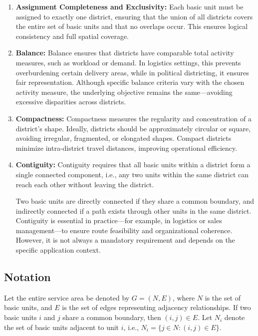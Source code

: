 \documentclass[preprint,12pt,authoryear]{elsarticle}
\begin{document}
\begin{enumerate}
    \item \textbf{Assignment Completeness and Exclusivity:} 
    Each basic unit must be assigned to exactly one district, ensuring that the union of all districts covers the entire set of basic units and that no overlaps occur. This ensures logical consistency and full spatial coverage.

    \item \textbf{Balance:} 
    Balance ensures that districts have comparable total activity measures, such as workload or demand. In logistics settings, this prevents overburdening certain delivery areas, while in political districting, it ensures fair representation. Although specific balance criteria vary with the chosen activity measure, the underlying objective remains the same—avoiding excessive disparities across districts.

    \item \textbf{Compactness:} 
    Compactness measures the regularity and concentration of a district’s shape. Ideally, districts should be approximately circular or square, avoiding irregular, fragmented, or elongated shapes. Compact districts minimize intra-district travel distances, improving operational efficiency.

    \item \textbf{Contiguity:} 
    Contiguity requires that all basic units within a district form a single connected component, i.e., any two units within the same district can reach each other without leaving the district.
    
    Two basic units are directly connected if they share a common boundary, and indirectly connected if a path exists through other units in the same district. 
    Contiguity is essential in practice—for example, in logistics or sales management—to ensure route feasibility and organizational coherence. However, it is not always a mandatory requirement and depends on the specific application context.
\end{enumerate}

\subsection{Notation}

Let the entire service area be denoted by \( G = (N, E) \), where \( N \) is the set of basic units, and \( E \) is the set of edges representing adjacency relationships. 
If two basic units \( i \) and \( j \) share a common boundary, then \( (i,j) \in E \). 
Let \( N_i \) denote the set of basic units adjacent to unit \( i \), i.e., \( N_i = \{ j \in N : (i,j) \in E \} \).
\end{document}
